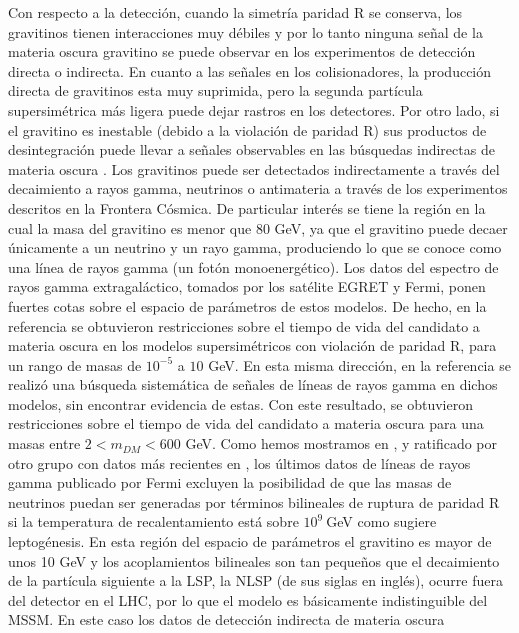 Con respecto a la detección, cuando la simetría paridad R se conserva,
los gravitinos tienen interacciones muy débiles y por lo tanto ninguna
señal de la materia oscura gravitino se puede observar en los
experimentos de detección directa o indirecta. En cuanto a las señales
en los colisionadores, la producción directa de gravitinos esta muy
suprimida, pero la segunda partícula supersimétrica más ligera puede
dejar rastros en los detectores. Por otro lado, si el gravitino es
inestable (debido a la violación de paridad R) sus productos de
desintegración puede llevar a señales observables en las búsquedas
indirectas de materia oscura
\cite{Bertone:2007aw,Ibarra:2007wg,Covi:2008jy,Ibarra:2008qg}. Los
gravitinos puede ser detectados indirectamente a través del
decaimiento a rayos gamma, neutrinos o antimateria a través de los
experimentos descritos en la Frontera Cósmica. De particular interés
se tiene la región en la cual la masa del gravitino es menor que $80$
GeV, ya que el gravitino puede decaer únicamente a un neutrino y un
rayo gamma, produciendo lo que se conoce como una línea de rayos gamma
(un fotón monoenergético). Los datos del espectro de rayos gamma
extragaláctico, tomados por los satélite EGRET y Fermi, ponen fuertes
cotas sobre el espacio de parámetros de estos modelos. De hecho, en la
referencia \cite{Yuksel:2007dr} se obtuvieron restricciones sobre el
tiempo de vida del candidato a materia oscura en los modelos
supersimétricos con violación de paridad R, para un rango de masas de
$10^{-5}$ a $10$ GeV. En esta misma dirección, en la referencia
\cite{Vertongen:2011mu} se realizó una búsqueda sistemática de señales
de líneas de rayos gamma en dichos modelos, sin encontrar evidencia de
estas. Con este resultado, se obtuvieron restricciones sobre el tiempo
de vida del candidato a materia oscura para una masas entre
$2<m_{DM}< 600$ GeV. Como hemos mostramos en \cite{Choi:2010jt},
y ratificado por otro grupo con datos más recientes en
\cite{Garny:2010eg}, los últimos datos de líneas de rayos gamma
publicado por Fermi excluyen la posibilidad de que las masas de
neutrinos puedan ser generadas por términos bilineales de ruptura de
paridad R si la temperatura de recalentamiento está sobre $10^9\ $GeV
como sugiere leptogénesis.  En esta región del espacio de parámetros
el gravitino es mayor de unos 10 GeV y los acoplamientos bilineales
son tan pequeños que el decaimiento de la partícula siguiente a la
LSP, la NLSP (de sus siglas en inglés), ocurre fuera del detector en
el LHC, por lo que el modelo es básicamente indistinguible del
MSSM. En este caso los datos de detección indirecta de materia oscura
